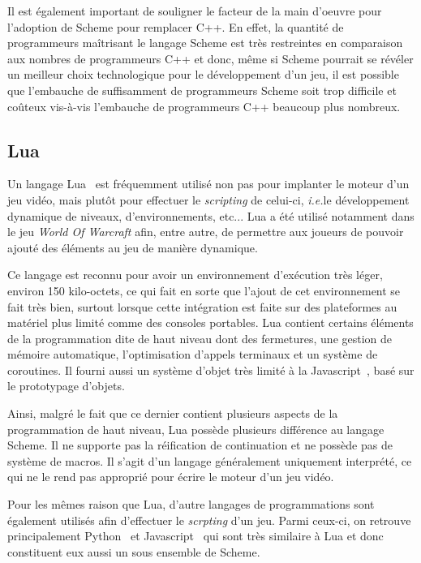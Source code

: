 \documentclass[12pt,oneside,letterpaper,francais]{book}
\newcommand{\ie}{{\textit{i.e.}}}
\begin{document}
Il est également important de souligner le facteur de la main d'oeuvre
pour l'adoption de Scheme pour remplacer C++. En effet, la quantité de
programmeurs maîtrisant le langage Scheme est très restreintes en
comparaison aux nombres de programmeurs C++ et donc, même si Scheme
pourrait se révéler un meilleur choix technologique pour le
développement d'un jeu, il est possible que l'embauche de suffisamment
de programmeurs Scheme soit trop difficile et coûteux vis-à-vis
l'embauche de programmeurs C++ beaucoup plus nombreux.


\subsection{Lua}

Un langage Lua~\cite{Lua} est fréquemment utilisé non pas pour
implanter le moteur d'un jeu vidéo, mais plutôt pour effectuer le
\textit{scripting} de celui-ci, \ie le développement dynamique de
niveaux, d'environnements, etc... Lua a été utilisé notamment dans le
jeu \textit{World Of Warcraft} afin, entre autre, de permettre aux
joueurs de pouvoir ajouté des éléments au jeu de manière dynamique.

Ce langage est reconnu pour avoir un environnement d'exécution très
léger, environ 150 kilo-octets, ce qui fait en sorte que l'ajout de
cet environnement se fait très bien, surtout lorsque cette intégration
est faite sur des plateformes au matériel plus limité comme des
consoles portables. Lua contient certains éléments de la programmation
dite de haut niveau dont des fermetures, une gestion de mémoire
automatique, l'optimisation d'appels terminaux et un système de
coroutines. Il fourni aussi un système d'objet très limité à la
Javascript~\cite{ECMA-262}, basé sur le prototypage d'objets.

Ainsi, malgré le fait que ce dernier contient plusieurs aspects de la
programmation de haut niveau, Lua possède plusieurs différence au
langage Scheme. Il ne supporte pas la réification de continuation et
ne possède pas de système de macros. Il s'agit d'un langage
généralement uniquement interprété, ce qui ne le rend pas approprié
pour écrire le moteur d'un jeu vidéo.

Pour les mêmes raison que Lua, d'autre langages de programmations sont
également utilisés afin d'effectuer le \textit{scrpting} d'un
jeu. Parmi ceux-ci, on retrouve principalement Python~\cite{Python} et
Javascript~\cite{ECMA-262} qui sont très similaire à Lua et donc
constituent eux aussi un sous ensemble de Scheme.
\end{document}
